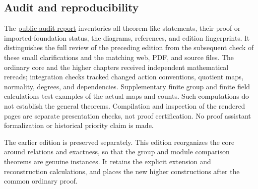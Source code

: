 \subsection{Audit and reproducibility}

The \href{https://tensorgami.com/notes/quotients-and-reconstruction-audit.html}{public audit report}
inventories all theorem-like statements, their proof or imported-foundation
status, the diagrams, references, and edition fingerprints. It distinguishes
the full review of the preceding edition from the subsequent check of these
small clarifications and the matching web, PDF, and source files.
The ordinary core and the higher chapters received
independent mathematical rereads; integration checks tracked changed
action conventions, quotient maps, normality, degrees, and dependencies.
Supplementary finite group and finite field calculations test examples
of the actual maps and counts. Such computations do not establish the
general theorems. Compilation and inspection of the rendered pages are
separate presentation checks, not proof certification. No proof assistant
formalization or historical priority claim is made.

The earlier edition is preserved separately. This edition reorganizes
the core around relations and exactness, so that the group and module
comparison theorems are genuine instances. It retains the explicit
extension and reconstruction calculations, and places the new higher
constructions after the common ordinary proof.

